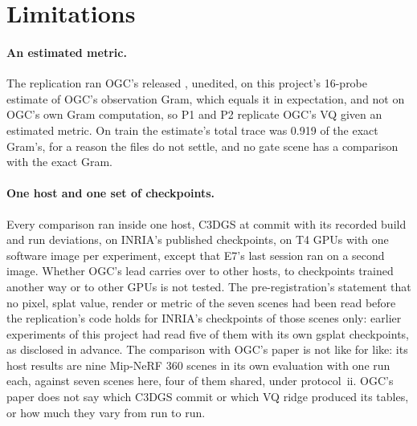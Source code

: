 \section{Limitations}
\label{sec:limits}

\paragraph{An estimated metric.}
The replication ran OGC's released , unedited, on this project's 16-probe estimate of OGC's observation Gram, which equals it in expectation, and not on OGC's own Gram computation, so P1 and P2 replicate OGC's VQ given an estimated metric. %
On train the estimate's total trace was 0.919 of the exact Gram's, for a reason the files do not settle, and no gate scene has a comparison with the exact Gram. %

\paragraph{One host and one set of checkpoints.}
Every comparison ran inside one host, C3DGS at commit  with its recorded build and run deviations, on INRIA's published checkpoints, on T4 GPUs with one software image per experiment, except that E7's last session ran on a second image. %
Whether OGC's lead carries over to other hosts, to checkpoints trained another way or to other GPUs is not tested. %
The pre-registration's statement that no pixel, splat value, render or metric of the seven scenes had been read before the replication's code holds for INRIA's checkpoints of those scenes only: earlier experiments of this project had read five of them with its own gsplat checkpoints, as disclosed in advance. %
The comparison with OGC's paper is not like for like: its host results are nine Mip-NeRF 360 scenes in its own evaluation with one run each, against seven scenes here, four of them shared, under protocol~ii. %
OGC's paper does not say which C3DGS commit or which VQ ridge produced its tables, or how much they vary from run to run. %

